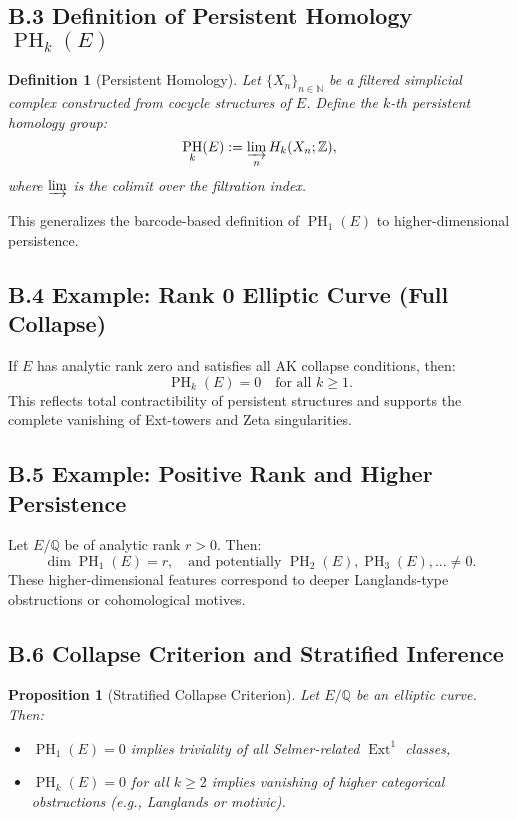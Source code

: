\documentclass[11pt]{article}
\newtheorem{definition}[theorem]{Definition}
\newtheorem{proposition}[theorem]{Proposition}
\DeclareMathOperator{\Ext}{Ext}
\DeclareMathOperator{\PH}{PH}
\newcommand{\QQ}{\mathbb{Q}}
\newcommand{\ZZ}{\mathbb{Z}}
\begin{document}
\subsection*{B.3 Definition of Persistent Homology $\PH_k(E)$}

\begin{definition}[Persistent Homology]
Let $\{X_n\}_{n \in \mathbb{N}}$ be a filtered simplicial complex constructed from cocycle structures of $E$. Define the $k$-th persistent homology group:
\[
\PH_k(E) := \varinjlim_{n} H_k(X_n; \ZZ),
\]
where $\varinjlim$ is the colimit over the filtration index.
\end{definition}

This generalizes the barcode-based definition of $\PH_1(E)$ to higher-dimensional persistence.

\subsection*{B.4 Example: Rank 0 Elliptic Curve (Full Collapse)}

If $E$ has analytic rank zero and satisfies all AK collapse conditions, then:
\[
\PH_k(E) = 0 \quad \text{for all } k \geq 1.
\]
This reflects total contractibility of persistent structures and supports the complete vanishing of Ext-towers and Zeta singularities.

\subsection*{B.5 Example: Positive Rank and Higher Persistence}

Let $E/\QQ$ be of analytic rank $r > 0$. Then:
\[
\dim \PH_1(E) = r, \quad \text{and potentially } \PH_2(E), \PH_3(E), \dots \neq 0.
\]
These higher-dimensional features correspond to deeper Langlands-type obstructions or cohomological motives.

\subsection*{B.6 Collapse Criterion and Stratified Inference}

\begin{proposition}[Stratified Collapse Criterion]
\label{prop:ph-stratified}
Let $E/\QQ$ be an elliptic curve. Then:
\begin{itemize}
  \item $\PH_1(E) = 0$ implies triviality of all Selmer-related $\Ext^1$ classes,
  \item $\PH_k(E) = 0$ for all $k \geq 2$ implies vanishing of higher categorical obstructions (e.g., Langlands or motivic).
\end{itemize}
\end{proposition}
\end{document}
